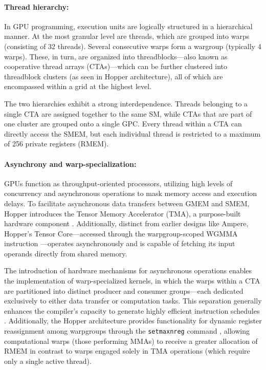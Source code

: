 \paragraph{Thread hierarchy:} In GPU programming, execution units are logically structured in a hierarchical manner. At the most granular level are threads, which are grouped into warps (consisting of 32 threads). Several consecutive warps form a wargroup (typically 4 warps). These, in turn, are organized into threadblocks—also known as cooperative thread arrays (CTAs)—which can be further clustered into threadblock clusters (as seen in Hopper architecture), all of which are encompassed within a grid at the highest level.

The two hierarchies exhibit a strong interdependence. Threads belonging to a single CTA are assigned together to the same SM, while CTAs that are part of one cluster are grouped onto a single GPC. Every thread within a CTA can directly access the SMEM, but each individual thread is restricted to a maximum of 256 private registers (RMEM).

\paragraph{Asynchrony and warp-specialization:}

GPUs function as throughput-oriented processors, utilizing high levels of concurrency and asynchronous operations to mask memory access and execution delays. To facilitate asynchronous data transfers between GMEM and SMEM, Hopper introduces the Tensor Memory Accelerator (TMA), a purpose-built hardware component \cite[\S7.29]{cuda}. Additionally, distinct from earlier designs like Ampere, Hopper’s Tensor Core—accessed through the warpgroup-scoped WGMMA instruction \cite[\S9.7.14]{ptx}—operates asynchronously and is capable of fetching its input operands directly from shared memory.

The introduction of hardware mechanisms for asynchronous operations enables the implementation of warp-specialized kernels, in which the warps within a CTA are partitioned into distinct producer and consumer groups—each dedicated exclusively to either data transfer or computation tasks. This separation generally enhances the compiler’s capacity to generate highly efficient instruction schedules \citep{warp-specialization-2011}. Additionally, the Hopper architecture provides functionality for dynamic register reassignment among warpgroups through the \verb|setmaxnreg| command \cite[\S9.7.17.1]{ptx}, allowing computational warps (those performing MMAs) to receive a greater allocation of RMEM in contrast to warps engaged solely in TMA operations (which require only a single active thread).

